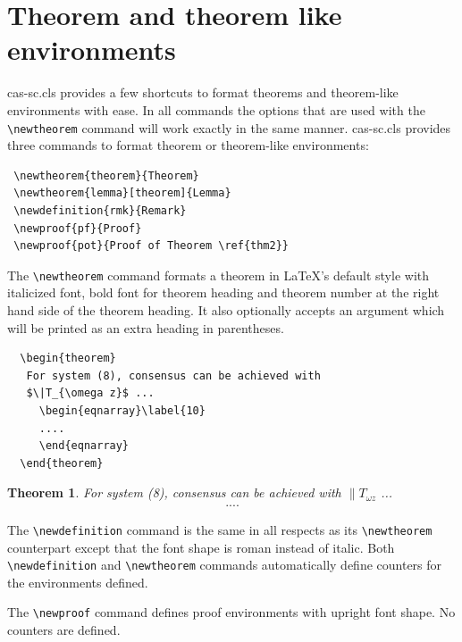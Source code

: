 \documentclass[a4paper,fleqn]{cas-sc}
\begin{document}
\section[Theorem and ...]{Theorem and theorem like environments}

{cas-sc.cls} provides a few shortcuts to format theorems and
theorem-like environments with ease. In all commands the options that
are used with the \verb+\newtheorem+ command will work exactly in the same
manner. {cas-sc.cls} provides three commands to format theorem or
theorem-like environments: 

\begin{verbatim}
 \newtheorem{theorem}{Theorem}
 \newtheorem{lemma}[theorem]{Lemma}
 \newdefinition{rmk}{Remark}
 \newproof{pf}{Proof}
 \newproof{pot}{Proof of Theorem \ref{thm2}}
\end{verbatim}


The \verb+\newtheorem+ command formats a
theorem in \LaTeX's default style with italicized font, bold font
for theorem heading and theorem number at the right hand side of the
theorem heading.  It also optionally accepts an argument which
will be printed as an extra heading in parentheses. 

\begin{verbatim}
  \begin{theorem} 
   For system (8), consensus can be achieved with 
   $\|T_{\omega z}$ ...
     \begin{eqnarray}\label{10}
     ....
     \end{eqnarray}
  \end{theorem}
\end{verbatim}  

\newtheorem{theorem}{Theorem}

\begin{theorem}
For system (8), consensus can be achieved with 
$\|T_{\omega z}$ ...
\begin{eqnarray}\label{10}
....
\end{eqnarray}
\end{theorem}

The \verb+\newdefinition+ command is the same in
all respects as its \verb+\newtheorem+ counterpart except that
the font shape is roman instead of italic.  Both
\verb+\newdefinition+ and \verb+\newtheorem+ commands
automatically define counters for the environments defined.

The \verb+\newproof+ command defines proof environments with
upright font shape.  No counters are defined. 
\end{document}
